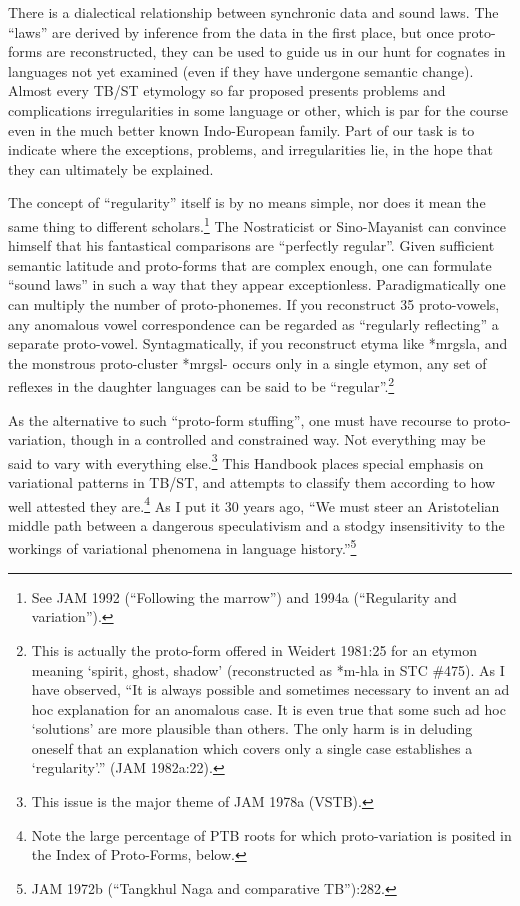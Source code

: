 There is a dialectical relationship between synchronic data and sound laws. The “laws” are derived by inference from the data in the first place, but once proto-forms are reconstructed, they can be used to guide us in our hunt for cognates in languages not yet examined (even if they have undergone semantic change). Almost every TB/ST etymology so far proposed presents problems and complications  irregularities  in some language or other, which is par for the course even in the much better known Indo-European family. Part of our task is to indicate where the exceptions, problems, and irregularities lie, in the hope that they can ultimately be explained.

The concept of “regularity” itself is by no means simple, nor does it mean the same thing to different scholars.\footnote{See JAM 1992 (“Following the marrow”) and 1994a (“Regularity and variation”).} The Nostraticist or Sino-Mayanist can convince himself that his fantastical comparisons are “perfectly regular”. Given sufficient semantic latitude and proto-forms that are complex enough, one can formulate “sound laws” in such a way that they appear exceptionless. Paradigmatically one can multiply the number of proto-phonemes. If you reconstruct 35 proto-vowels, any anomalous vowel correspondence can be regarded as “regularly reflecting” a separate proto-vowel. Syntagmatically, if you reconstruct etyma like *mrgsla, and the monstrous proto-cluster *mrgsl- occurs only in a single etymon, any set of reflexes in the daughter languages can be said to be “regular”.\footnote{This is actually the proto-form offered in Weidert 1981:25 for an etymon meaning ‘spirit, ghost, shadow’ (reconstructed as *m-hla in STC \#475). As I have observed, “It is always possible and sometimes necessary to invent an ad hoc explanation for an anomalous case. It is even true that some such ad hoc ‘solutions’ are more plausible than others. The only harm is in deluding oneself that an explanation which covers only a single case establishes a ‘regularity’.” (JAM 1982a:22).}

As the alternative to such “proto-form stuffing”, one must have recourse to proto-variation, though in a controlled and constrained way. Not everything may be said to vary with everything else.\footnote{This issue is the major theme of JAM 1978a (VSTB).} This Handbook places special emphasis on variational patterns in TB/ST, and attempts to classify them according to how well attested they are.\footnote{Note the large percentage of PTB roots for which proto-variation is posited in the Index of Proto-Forms, below.} As I put it 30 years ago, “We must steer an Aristotelian middle path between a dangerous speculativism and a stodgy insensitivity to the workings of variational phenomena in language history.”\footnote{JAM 1972b (“Tangkhul Naga and comparative TB”):282.}

